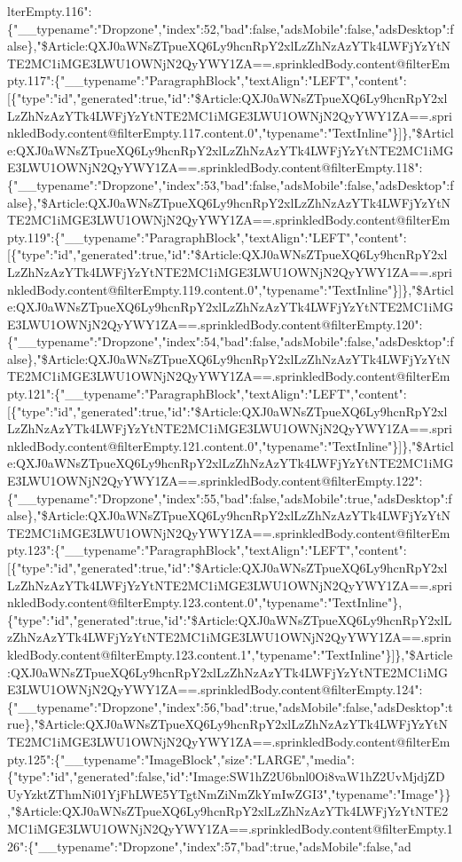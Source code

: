 lterEmpty.116":\{"\_\_typename":"Dropzone","index":52,"bad":false,"adsMobile":false,"adsDesktop":false\},"\$Article:QXJ0aWNsZTpueXQ6Ly9hcnRpY2xlLzZhNzAzYTk4LWFjYzYtNTE2MC1iMGE3LWU1OWNjN2QyYWY1ZA==.sprinkledBody.content@filterEmpty.117":\{"\_\_typename":"ParagraphBlock","textAlign":"LEFT","content":{[}\{"type":"id","generated":true,"id":"\$Article:QXJ0aWNsZTpueXQ6Ly9hcnRpY2xlLzZhNzAzYTk4LWFjYzYtNTE2MC1iMGE3LWU1OWNjN2QyYWY1ZA==.sprinkledBody.content@filterEmpty.117.content.0","typename":"TextInline"\}{]}\},"\$Article:QXJ0aWNsZTpueXQ6Ly9hcnRpY2xlLzZhNzAzYTk4LWFjYzYtNTE2MC1iMGE3LWU1OWNjN2QyYWY1ZA==.sprinkledBody.content@filterEmpty.118":\{"\_\_typename":"Dropzone","index":53,"bad":false,"adsMobile":false,"adsDesktop":false\},"\$Article:QXJ0aWNsZTpueXQ6Ly9hcnRpY2xlLzZhNzAzYTk4LWFjYzYtNTE2MC1iMGE3LWU1OWNjN2QyYWY1ZA==.sprinkledBody.content@filterEmpty.119":\{"\_\_typename":"ParagraphBlock","textAlign":"LEFT","content":{[}\{"type":"id","generated":true,"id":"\$Article:QXJ0aWNsZTpueXQ6Ly9hcnRpY2xlLzZhNzAzYTk4LWFjYzYtNTE2MC1iMGE3LWU1OWNjN2QyYWY1ZA==.sprinkledBody.content@filterEmpty.119.content.0","typename":"TextInline"\}{]}\},"\$Article:QXJ0aWNsZTpueXQ6Ly9hcnRpY2xlLzZhNzAzYTk4LWFjYzYtNTE2MC1iMGE3LWU1OWNjN2QyYWY1ZA==.sprinkledBody.content@filterEmpty.120":\{"\_\_typename":"Dropzone","index":54,"bad":false,"adsMobile":false,"adsDesktop":false\},"\$Article:QXJ0aWNsZTpueXQ6Ly9hcnRpY2xlLzZhNzAzYTk4LWFjYzYtNTE2MC1iMGE3LWU1OWNjN2QyYWY1ZA==.sprinkledBody.content@filterEmpty.121":\{"\_\_typename":"ParagraphBlock","textAlign":"LEFT","content":{[}\{"type":"id","generated":true,"id":"\$Article:QXJ0aWNsZTpueXQ6Ly9hcnRpY2xlLzZhNzAzYTk4LWFjYzYtNTE2MC1iMGE3LWU1OWNjN2QyYWY1ZA==.sprinkledBody.content@filterEmpty.121.content.0","typename":"TextInline"\}{]}\},"\$Article:QXJ0aWNsZTpueXQ6Ly9hcnRpY2xlLzZhNzAzYTk4LWFjYzYtNTE2MC1iMGE3LWU1OWNjN2QyYWY1ZA==.sprinkledBody.content@filterEmpty.122":\{"\_\_typename":"Dropzone","index":55,"bad":false,"adsMobile":true,"adsDesktop":false\},"\$Article:QXJ0aWNsZTpueXQ6Ly9hcnRpY2xlLzZhNzAzYTk4LWFjYzYtNTE2MC1iMGE3LWU1OWNjN2QyYWY1ZA==.sprinkledBody.content@filterEmpty.123":\{"\_\_typename":"ParagraphBlock","textAlign":"LEFT","content":{[}\{"type":"id","generated":true,"id":"\$Article:QXJ0aWNsZTpueXQ6Ly9hcnRpY2xlLzZhNzAzYTk4LWFjYzYtNTE2MC1iMGE3LWU1OWNjN2QyYWY1ZA==.sprinkledBody.content@filterEmpty.123.content.0","typename":"TextInline"\},\{"type":"id","generated":true,"id":"\$Article:QXJ0aWNsZTpueXQ6Ly9hcnRpY2xlLzZhNzAzYTk4LWFjYzYtNTE2MC1iMGE3LWU1OWNjN2QyYWY1ZA==.sprinkledBody.content@filterEmpty.123.content.1","typename":"TextInline"\}{]}\},"\$Article:QXJ0aWNsZTpueXQ6Ly9hcnRpY2xlLzZhNzAzYTk4LWFjYzYtNTE2MC1iMGE3LWU1OWNjN2QyYWY1ZA==.sprinkledBody.content@filterEmpty.124":\{"\_\_typename":"Dropzone","index":56,"bad":true,"adsMobile":false,"adsDesktop":true\},"\$Article:QXJ0aWNsZTpueXQ6Ly9hcnRpY2xlLzZhNzAzYTk4LWFjYzYtNTE2MC1iMGE3LWU1OWNjN2QyYWY1ZA==.sprinkledBody.content@filterEmpty.125":\{"\_\_typename":"ImageBlock","size":"LARGE","media":\{"type":"id","generated":false,"id":"Image:SW1hZ2U6bnl0Oi8vaW1hZ2UvMjdjZDUyYzktZThmNi01YjFhLWE5YTgtNmZiNmZkYmIwZGI3","typename":"Image"\}\},"\$Article:QXJ0aWNsZTpueXQ6Ly9hcnRpY2xlLzZhNzAzYTk4LWFjYzYtNTE2MC1iMGE3LWU1OWNjN2QyYWY1ZA==.sprinkledBody.content@filterEmpty.126":\{"\_\_typename":"Dropzone","index":57,"bad":true,"adsMobile":false,"ad